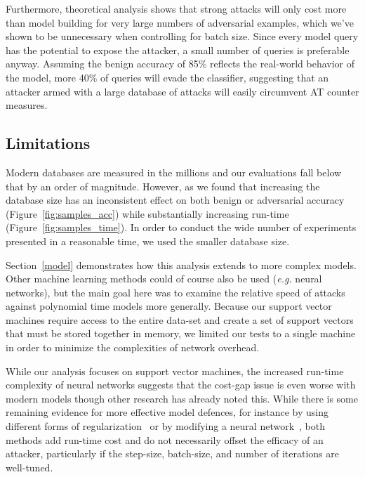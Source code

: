 \documentclass[runningheads]{llncs}
\begin{document}
Furthermore, theoretical analysis shows that strong attacks will only cost more than model building for very large numbers of adversarial examples, which we've shown to be unnecessary when controlling for batch size. Since every model query has the potential to expose the attacker, a small number of queries is preferable anyway. Assuming the benign accuracy of 85\% reflects the real-world behavior of the model, more 40\% of queries will evade the classifier, suggesting that an attacker armed with a large database of attacks will easily circumvent AT counter measures.

\subsection{Limitations}

Modern databases are measured in the millions and our evaluations fall below that by an order of magnitude. However, as we found that increasing the database size has an inconsistent effect on both benign or adversarial accuracy (Figure~\ref{fig:samples_acc}) while substantially increasing run-time (Figure~\ref{fig:samples_time}). In order to conduct the wide number of experiments presented in a reasonable time, we used the smaller database size.

Section~\ref{model} demonstrates how this analysis extends to more complex models. Other machine learning methods could of course also be used (\textit{e.g.} neural networks), but the main goal here was to examine the relative speed of attacks against polynomial time models more generally.  Because our support vector machines require access to the entire data-set and create a set of support vectors that must be stored together in memory, we limited our tests to a single machine in order to minimize the complexities of network overhead. 

While our analysis focuses on support vector machines, the increased run-time complexity of neural networks suggests that the cost-gap issue is even worse with modern models though other research \cite{meyers2023safety} has already noted this. While there is some remaining evidence for more effective model defences, for instance by using different forms of regularization~\cite{jakubovitz2018improving,ross2018improving} or by modifying a neural network~\cite{firenet}, both methods add run-time cost and do not necessarily offset the efficacy of an attacker, particularly if the step-size, batch-size, and number of iterations are well-tuned.
\end{document}
